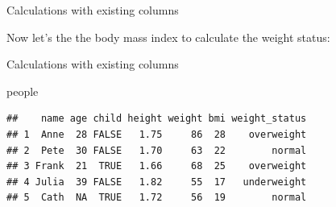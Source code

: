 \documentclass[ignorenonframetext,]{beamer}
\newenvironment{Shaded}{\begin{snugshade}}{\end{snugshade}}
\newcommand{\FloatTok}[1]{\textcolor[rgb]{0.00,0.00,0.81}{#1}}
\newcommand{\KeywordTok}[1]{\textcolor[rgb]{0.13,0.29,0.53}{\textbf{#1}}}
\newcommand{\NormalTok}[1]{#1}
\newcommand{\OperatorTok}[1]{\textcolor[rgb]{0.81,0.36,0.00}{\textbf{#1}}}
\newcommand{\StringTok}[1]{\textcolor[rgb]{0.31,0.60,0.02}{#1}}
\begin{document}
\begin{frame}[fragile]{Calculations with existing columns}
\protect\hypertarget{calculations-with-existing-columns-1}{}

Now let's the the body mass index to calculate the weight status:

\begin{Shaded}
\end{Shaded}

\end{frame}

\begin{frame}[fragile]{Calculations with existing columns}
\protect\hypertarget{calculations-with-existing-columns-2}{}

\begin{Shaded}
\begin{Highlighting}[]
\NormalTok{people}
\end{Highlighting}
\end{Shaded}

\begin{verbatim}
##    name age child height weight bmi weight_status
## 1  Anne  28 FALSE   1.75     86  28    overweight
## 2  Pete  30 FALSE   1.70     63  22        normal
## 3 Frank  21  TRUE   1.66     68  25    overweight
## 4 Julia  39 FALSE   1.82     55  17   underweight
## 5  Cath  NA  TRUE   1.72     56  19        normal
\end{verbatim}

\end{frame}
\end{document}
